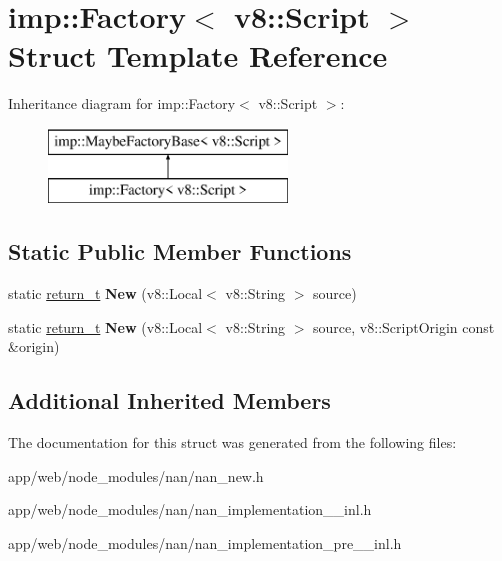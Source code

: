 \hypertarget{structimp_1_1_factory_3_01v8_1_1_script_01_4}{}\section{imp\+:\+:Factory$<$ v8\+:\+:Script $>$ Struct Template Reference}
\label{structimp_1_1_factory_3_01v8_1_1_script_01_4}
Inheritance diagram for imp\+:\+:Factory$<$ v8\+:\+:Script $>$\+:\begin{figure}[H]
\begin{center}
\leavevmode
\includegraphics[height=2.000000cm]{structimp_1_1_factory_3_01v8_1_1_script_01_4}
\end{center}
\end{figure}
\subsection*{Static Public Member Functions}
\begin{DoxyCompactItemize}
\item 
\mbox{\label{structimp_1_1_factory_3_01v8_1_1_script_01_4_a493ff0d9f67fd2328554a3d047925025}} 
static \hyperlink{class_maybe_local}{return\+\_\+t} {\bfseries New} (v8\+::\+Local$<$ v8\+::\+String $>$ source)
\item 
\mbox{\label{structimp_1_1_factory_3_01v8_1_1_script_01_4_ae55ef84162a519f01ed3a7558e69e6e3}} 
static \hyperlink{class_maybe_local}{return\+\_\+t} {\bfseries New} (v8\+::\+Local$<$ v8\+::\+String $>$ source, v8\+::\+Script\+Origin const \&origin)
\end{DoxyCompactItemize}
\subsection*{Additional Inherited Members}


The documentation for this struct was generated from the following files\+:\begin{DoxyCompactItemize}
\item 
app/web/node\+\_\+modules/nan/nan\+\_\+new.\+h\item 
app/web/node\+\_\+modules/nan/nan\+\_\+implementation\+\_\+\_\+inl.\+h\item 
app/web/node\+\_\+modules/nan/nan\+\_\+implementation\+\_\+pre\+\_\+\_\+inl.\+h\end{DoxyCompactItemize}
